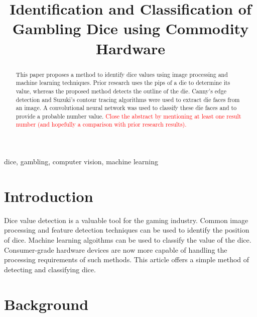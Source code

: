 \documentclass[conference]{IEEEtran}
\begin{document}
\title{
	Identification and Classification of Gambling Dice using Commodity Hardware
}

\author{
}

\maketitle

\begin{abstract}
	This paper proposes a method to identify dice values using image processing and machine learning techniques.
	Prior research uses the pips of a die to determine its value, whereas the proposed method detects the outline of the die.
	Canny's edge detection and Suzuki's contour tracing algorithms were used to extract die faces from an image.
	A convolutional neural network was used to classify these die faces and to provide a probable number value.
	\textcolor{red}{Close the abstract by mentioning at least one result number (and hopefully a comparison with prior research results).}
\end{abstract}

\begin{IEEEkeywords}
	dice, gambling, computer vision, machine learning
\end{IEEEkeywords}

\section{Introduction}

Dice value detection is a valuable tool for the gaming industry.
Common image processing and feature detection techniques can be used to identify the position of dice.
Machine learning algoithms can be used to classify the value of the dice.
Consumer-grade hardware devices are now more capable of handling the processing requirements of such methods.
This article offers a simple method of detecting and classifying dice.

\section{Background}

\end{document}
